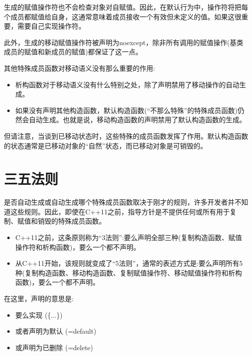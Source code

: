 生成的赋值操作符也不会检查对象对自赋值。因此，在默认行为中，操作符将把每个成员都赋值给自身，这通常意味着成员接收一个有效但未定义的值。如果这很重要，需要自己实现操作符。\par

此外，生成的移动赋值操作符被声明为noexcept，除非所有调用的赋值操作(基类成员的赋值和新成员的赋值)都保证了这一点。\par


其他特殊成员函数对移动语义没有那么重要的作用:\par

\begin{itemize}
  \item 析构函数对于移动语义没有什么特别之处，除了声明禁用了移动操作的自动生成。
  \item 如果没有声明其他构造函数，默认构造函数(“不那么特殊”的特殊成员函数)仍然会自动生成。也就是说，移动构造函数的声明禁用了默认构造函数的生成。
\end{itemize}

但请注意，当谈到已移动状态时，这些特殊的成员函数发挥了作用。默认构造函数的状态通常是已移动对象的“自然”状态，而已移动对象是可销毁的。\par


\section{三五法则}

是否自动生成或自动生成哪个特殊成员函数取决于刚才的规则，许多开发者并不知道这些规则。因此，即使在C++11之前，指导方针是不提供任何或所有用于复制、赋值和销毁的特殊成员函数。\par

\begin{itemize}
  \item C++11之前，这条原则称为“3法则”:要么声明全部三种(复制构造函数、赋值操作符和析构函数)，要么一个都不声明。
  \item 从C++11开始，该规则就变成了“5法则”，通常的表述方式是:要么声明所有5种(复制构造函数、移动构造函数、复制赋值操作符、移动赋值操作符和析构函数)，要么一个都不声明。
\end{itemize}

在这里，声明的意思是:\par

\begin{itemize}
  \item 要么实现 (\{...\})
  \item 或者声明为默认 (=default)
  \item 或声明为已删除 (=delete)
\end{itemize}

